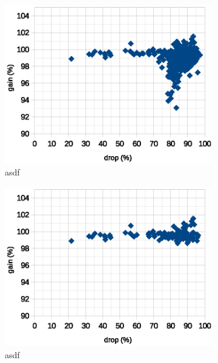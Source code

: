 \documentclass[12pt]{report}
\begin{document}
\begin{center}
\begin{figure}[h!]
\begin{subfigure}[b]{0.49\linewidth}
			\includegraphics[scale=0.7]{dia/all_first.eps}
			\caption{asdf}
		\end{subfigure}
		\begin{subfigure}[b]{0.49\linewidth}
			\centering
			\includegraphics[scale=0.7]{dia/best_first.eps}
			\caption{asdf}
		\end{subfigure}
		\begin{subfigure}[b]{0.49\linewidth}
			\centering

\end{subfigure}
\end{figure}
\end{center}
\end{document}
